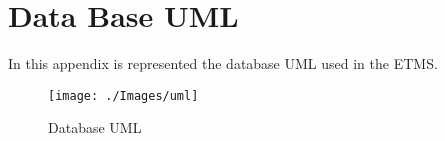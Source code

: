 \chapter{Data Base \ac{UML}}
\label{chapter:appendixB}
In this appendix is represented the database \ac{UML} used in the \ac{ETMS}. 

\begin{figure}[h]
\centering
\texttt{[image: ./Images/uml]}
\caption{Database \ac{UML}}
\label{fig:uml}
\end{figure}